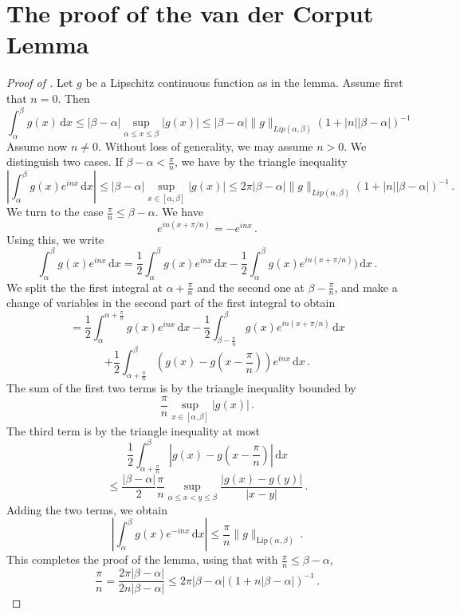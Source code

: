 \section{The proof of the van der Corput Lemma}
\label{10vandercorput}

\begin{proof}[Proof of ]
\leanok
Let $g$ be a Lipschitz continuous function as in the lemma.
Assume first that $n=0$. Then
\begin{equation*}
    \int_\alpha^\beta g(x) \, \mathrm{d}x \le |\beta - \alpha| \sup_{\alpha\le x\le \beta}|g(x)|
    \le |\beta-\alpha|\|g\|_{Lip(\alpha,\beta)}(1+|n||\beta-\alpha|)^{-1}
\end{equation*}
Assume now $n\ne 0$. Without loss of generality, we may assume $n>0$.
We distinguish two cases. If $\beta-\alpha < \frac{\pi}{n}$, we have by the triangle inequality
\begin{equation*}
    \left|\int_\alpha^\beta g(x) e^{inx} \, \mathrm{d}x\right|
    \le |\beta -\alpha| \sup_{x \in [\alpha,\beta]} |g(x)|
    \le 2\pi |\beta-\alpha|\|g\|_{Lip(\alpha,\beta)}(1+|n||\beta-\alpha|)^{-1} \,.
\end{equation*}
We turn to the case $\frac{\pi}{n} \le \beta-\alpha$.
We have
$$
    e^{in(x + \pi/n)} = -e^{inx}\,.
$$
Using this, we write
$$
    \int_\alpha^\beta g(x) e^{inx} \, \mathrm{d}x
    = \frac{1}{2} \int_\alpha^\beta g(x) e^{inx} \, \mathrm{d}x - \frac{1}{2} \int_\alpha^\beta g(x) e^{in(x + \pi/n)}) \, \mathrm{d}x\,.
$$
We split the the first integral at $\alpha + \frac{\pi}{n}$ and the second one at $\beta - \frac{\pi}{n}$, and make a change of variables in the second part of the first integral to obtain
$$
    = \frac{1}{2} \int_{\alpha}^{\alpha + \frac{\pi}{n}} g(x) e^{inx} \, \mathrm{d}x - \frac{1}{2} \int_{\beta - \frac{\pi}{n}}^{\beta} g(x) e^{in(x + \pi/n)} \, \mathrm{d}x
$$
$$
    + \frac{1}{2} \int_{\alpha + \frac{\pi}{n}}^{\beta} (g(x) - g(x - \frac{\pi}{n})) e^{inx} \, \mathrm{d}x\,.
$$
The sum of the first two terms is by the triangle inequality bounded by
$$
    \frac{\pi}{n} \sup_{x \in [\alpha,\beta]} |g(x)|\,.
$$
The third term is by the triangle inequality at most
$$
    \frac{1}{2} \int_{\alpha + \frac{\pi}{n}}^\beta |g(x) - g(x - \frac{\pi}{n})| \, \mathrm{d}x
$$
$$
    \le \frac{|\beta-\alpha|}{2} \frac{\pi}{n} \sup_{\alpha \le x < y \le \beta} \frac{|g(x) - g(y)|}{|x-y|}\,.
$$
Adding the two terms, we obtain
$$
    \left|\int_\alpha^\beta g(x) e^{-inx} \, \mathrm{d}x\right| \le \frac{\pi}{n} \|g\|_{\mathrm{Lip}(\alpha,\beta)}\,.
$$
This completes the proof of the lemma, using that with $\frac{\pi}{n} \le \beta-\alpha$,
$$
    \frac{\pi}{n} = \frac{2 \pi |\beta-\alpha|}{2n|\beta-\alpha|} \le 2 \pi |\beta-\alpha|(1 + n|\beta-\alpha|)^{-1}\,.
$$
\end{proof}




